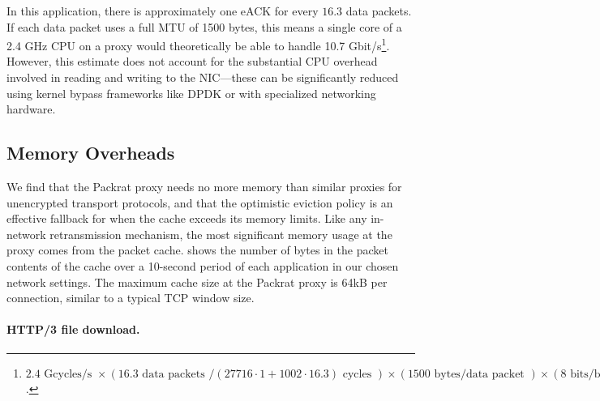 

In this application, there is approximately one eACK for every $16.3$ data
packets. If each data packet uses a full MTU of 1500 bytes, this means a single
core of a 2.4 GHz CPU on a proxy would theoretically be able to handle 10.7
Gbit/s\footnote{ $2.4\text{ Gcycles/s }
\times(16.3 \text{ data packets } / (27716\cdot1 + 1002\cdot16.3) \text{ cycles })
\times (1500 \text{ bytes/data packet })
\times (8 \text{ bits/byte })
= 10.7 \text{ Gbit/s}$.
}. However, this estimate does not account for the substantial CPU overhead
involved in reading and writing to the NIC---these can be significantly reduced
using kernel bypass frameworks like DPDK or with specialized networking
hardware.



\subsection{Memory Overheads}



We find that the Packrat proxy needs no more memory
than similar proxies for unencrypted transport protocols, and that the optimistic
eviction policy is an effective fallback for when the cache exceeds its memory limits.
Like any in-network retransmission mechanism,
the most significant memory usage at the proxy comes from the packet
cache.  shows the number of bytes in the packet contents of
the cache over a 10-second period of each application in our chosen
network settings. The maximum cache size
at the Packrat proxy is 64kB per connection, similar to a typical TCP window size.

\paragraph{HTTP/3 file download.}

